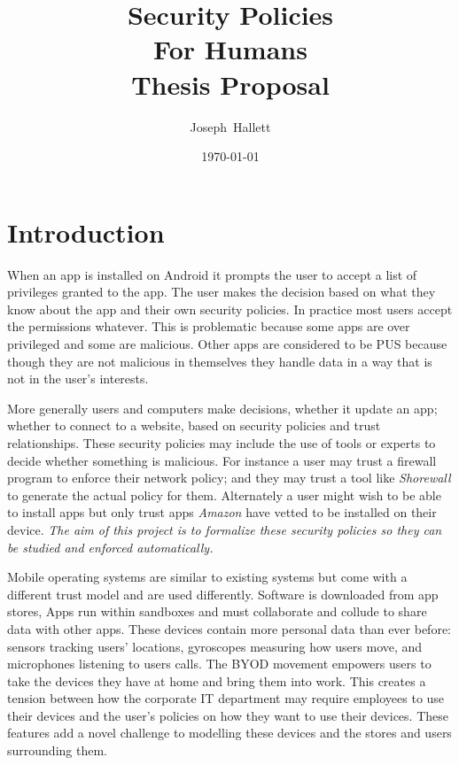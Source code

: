 \documentclass[a4paper,sfsidenotes]{tufte-book}
\title{Security Policies\\For Humans\\Thesis Proposal}
\author{Joseph~Hallett}
\date\today
\begin{document}
\maketitle
\setcounter{tocdepth}{3}
\tableofcontents
\pagebreak

\section{Introduction}

When an app is installed on Android it prompts the user to accept a list of
privileges granted to the app.  The user makes the decision based on what they
know about the app and their own security policies.  In practice most
users accept the permissions whatever.  This is problematic because some apps
are over privileged\cite{Felt:2011kj} and some are malicious\cite{Zhou:2012cf}.
Other apps are considered to be \ac{PUS} because though they are not malicious
in themselves they handle data in a way that is not in the user's interests.

More generally users and computers make decisions, whether it update an app;
whether to connect to a website, based on security policies and trust
relationships.  These security policies may include the use of tools or experts
to decide whether something is malicious.  For instance a user may trust a
firewall program to enforce their network policy; and they may trust a tool like
\emph{Shorewall} to generate the actual policy for them.  Alternately a user
might wish to be able to install apps but only trust apps \emph{Amazon} have
vetted to be installed on their device.  \emph{The aim of this project is to
  formalize these security policies so they can be studied and enforced
  automatically.}

Mobile operating systems are similar to existing systems but come with a
different trust model and are used differently.  Software is
downloaded from app stores, Apps run within sandboxes and must collaborate and
collude to share data with other apps. These devices contain more personal data
than ever before: sensors tracking users' locations,  gyroscopes measuring how
users move, and microphones listening to users calls.  The \ac{BYOD} movement
empowers users to take the devices they have at home and bring them into work.
This creates a tension between how the corporate IT department may require
employees to use their devices and the user's policies on how they want to use
their devices.  These features add a novel challenge to modelling these devices
and the stores and users surrounding them.  
\end{document}

